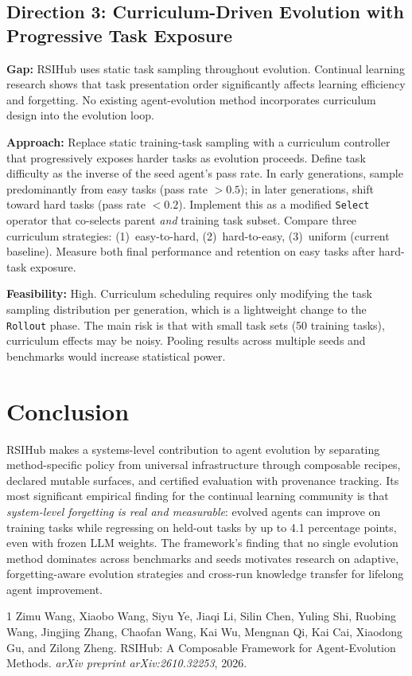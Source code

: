 \documentclass[11pt,a4paper]{article}
\begin{document}
\subsection{Direction 3: Curriculum-Driven Evolution with Progressive Task Exposure}
\textbf{Gap:} RSIHub uses static task sampling throughout evolution. Continual learning research shows that task presentation order significantly affects learning efficiency and forgetting. No existing agent-evolution method incorporates curriculum design into the evolution loop.

\textbf{Approach:} Replace static training-task sampling with a curriculum controller that progressively exposes harder tasks as evolution proceeds. Define task difficulty as the inverse of the seed agent's pass rate. In early generations, sample predominantly from easy tasks (pass rate $> 0.5$); in later generations, shift toward hard tasks (pass rate $< 0.2$). Implement this as a modified \texttt{Select} operator that co-selects parent \emph{and} training task subset. Compare three curriculum strategies: (1)~easy-to-hard, (2)~hard-to-easy, (3)~uniform (current baseline). Measure both final performance and retention on easy tasks after hard-task exposure.

\textbf{Feasibility:} High. Curriculum scheduling requires only modifying the task sampling distribution per generation, which is a lightweight change to the \texttt{Rollout} phase. The main risk is that with small task sets (50 training tasks), curriculum effects may be noisy. Pooling results across multiple seeds and benchmarks would increase statistical power.

\section{Conclusion}
RSIHub makes a systems-level contribution to agent evolution by separating method-specific policy from universal infrastructure through composable recipes, declared mutable surfaces, and certified evaluation with provenance tracking. Its most significant empirical finding for the continual learning community is that \emph{system-level forgetting is real and measurable}: evolved agents can improve on training tasks while regressing on held-out tasks by up to 4.1 percentage points, even with frozen LLM weights. The framework's finding that no single evolution method dominates across benchmarks and seeds motivates research on adaptive, forgetting-aware evolution strategies and cross-run knowledge transfer for lifelong agent improvement.


\begin{thebibliography}{1}
Zimu Wang, Xiaobo Wang, Siyu Ye, Jiaqi Li, Silin Chen, Yuling Shi, Ruobing Wang, Jingjing Zhang, Chaofan Wang, Kai Wu, Mengnan Qi, Kai Cai, Xiaodong Gu, and Zilong Zheng.
\newblock RSIHub: A Composable Framework for Agent-Evolution Methods.
\newblock \emph{arXiv preprint arXiv:2610.32253}, 2026.
\end{thebibliography}
\end{document}
